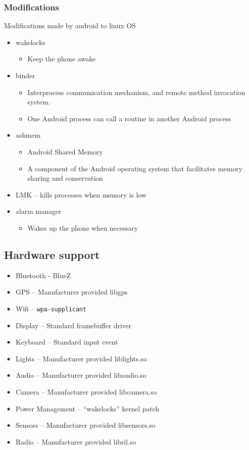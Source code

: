 \documentclass{article}
\begin{document}
\begin{multicols}{2}

\subsubsection{Modifications}

\begin{flushleft}
  Modifications made by android to linux OS
\end{flushleft}
\begin{itemize}
  \item wakelocks
  \begin{itemize}
  	\item Keep the phone awake
  \end{itemize}
  \item binder
  	\begin{itemize}
  		\item Interprocess communication mechanism, and remote method invocation system.
  		\item One Android process can call a routine in another Android process
  	\end{itemize}
  \item ashmem
  \begin{itemize}
  	\item Android Shared Memory
  	\item A component of the Android operating system that facilitates memory sharing and conservation
  \end{itemize}
  \item LMK – kills processes when memory is low
  \item alarm manager
  \begin{itemize}
  	\item Wakes up the phone when necessary
  \end{itemize}
\end{itemize}

\vfill\null

\subsection{Hardware support}
\begin{itemize}
  \item Bluetooth - BlueZ
  \item GPS – Manufacturer provided libgps
  \item Wifi – \texttt{wpa-supplicant}
  \item Display – Standard framebuffer driver
  \item Keyboard – Standard input event
  \item Lights – Manufacturer provided liblights.so
  \item Audio – Manufacturer provided libaudio.so
  \item Camera – Manufacturer provided libcamera.so
  \item Power Management – “wakelocks” kernel patch
  \item Sensors – Manufacturer provided libsensors.so
  \item Radio – Manufacturer provided libril.so
\end{itemize}


\end{multicols}
\end{document}
